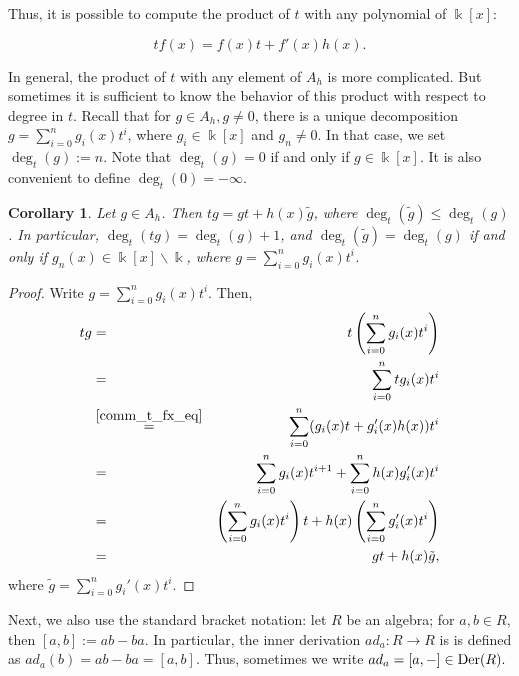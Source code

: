 \documentclass{article}
\numberwithin{equation}{section}\theoremstyle{plain}
\newtheorem{corollary}[theorem]{Corollary}
\newcommand{\der}{{\rm Der}}
\begin{document}
Thus, it is possible to compute the product of $t$ with any polynomial of $\Bbbk[x]$: 

\begin{equation}\label{comm_t_fx_eq}
t f(x) = f(x) t + f'(x)h(x).
\end{equation}


In general, the product of $t$ with any element of $A_h$ is more complicated.
But sometimes it is sufficient to know the behavior of this product with respect to degree in $t$.
Recall that for $g \in A_h, g \neq 0$, there is a unique decomposition $g = \sum_{i=0}^n g_i(x)t^i$, where $g_i \in \Bbbk[x]$ and $g_n\neq 0$.
In that case, we set $\deg_t(g):=n$.
Note that $\deg_t(g)=0$ if and only if $g \in \Bbbk[x]$.
It is also convenient to define $\deg_t(0)=-\infty$.

\begin{corollary}\label{comm_t_g}
    Let $g \in A_h$. Then $t g = g t + h(x)\tilde{g}$, where $\deg_t(\tilde{g}) \leq \deg_t(g)$.
    In particular, $\deg_t( t g ) = \deg_t (g) + 1$, and $\deg_t(\tilde{g})= \deg_t(g)$ if and only if $g_n(x) \in \Bbbk[x] \backslash \Bbbk$, where $g = \sum_{i=0}^n g_i(x) t^i$.
\end{corollary}

\begin{proof}
    Write $g = \sum_{i=0}^n g_i(x)t^i$.
    Then,
    \begin{eqnarray*}
        t g & = & t \left( \sum_{i=0}^n g_i(x)t^i \right) \\
        & = & \sum_{i=0}^n t g_i(x) t^i \\
        & \stackrel{\eqref{comm_t_fx_eq}}{=} & \sum_{i=0}^n (g_i(x) t + g_i'(x) h(x)) t^i \\
        & = & \sum_{i=0}^n g_i(x)t^{i+1} + \sum_{i=0}^n h(x)g_i'(x)t^i \\
        & = & \left( \sum_{i=0}^n g_i(x)t^i \right) t + h(x) \left( \sum_{i=0}^n g_i'(x)t^i \right) \\
        & = &  gt + h(x) \tilde{g},
    \end{eqnarray*}
    where $\tilde{g}= \sum_{i=0}^n g_i'(x)t^i$.
\end{proof}

\medbreak

Next, we also use the standard bracket notation:
let $R$ be an algebra; for $a,b \in R$, then $[a,b]:=ab-ba$.
In particular, the inner derivation $ad_a : R \to R$ is is defined as $ad_a(b)=ab-ba = [a,b]$.
Thus, sometimes we write $ad_a = [a, -] \in \der(R).$
\end{document}
